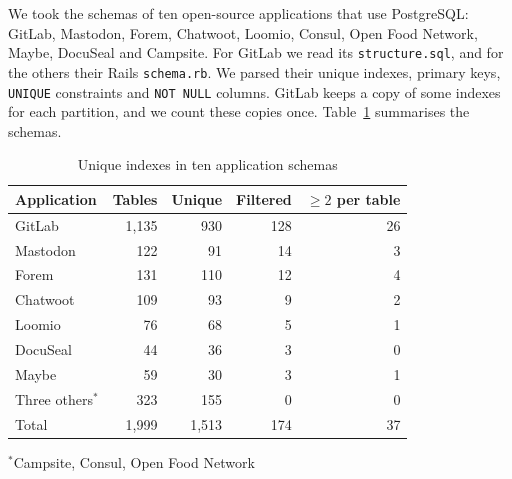 \documentclass[conference]{IEEEtran}
\theoremstyle{definition}
\newcommand{\sql}[1]{\texttt{#1}}
\begin{document}
We took the schemas of ten open-source applications that use PostgreSQL: GitLab, Mastodon, Forem, Chatwoot,
Loomio, Consul, Open Food Network, Maybe, DocuSeal and Campsite. For GitLab we read its \sql{structure.sql}, and for
the others their Rails \sql{schema.rb}. We parsed their unique indexes, primary keys, \sql{UNIQUE} constraints and
\sql{NOT NULL} columns. GitLab keeps a copy of some indexes for each partition, and we count these copies once.
Table~\ref{tab:schemas} summarises the schemas.

\begin{table}[t]
\caption{Unique indexes in ten application schemas}\label{tab:schemas}
\centering\small
\setlength{\tabcolsep}{4pt}
\begin{tabular}{lrrrr}
\toprule
Application & Tables & Unique & Filtered & $\ge2$ per table \\
\midrule
GitLab & 1{,}135 & 930 & 128 & 26 \\
Mastodon & 122 & 91 & 14 & 3 \\
Forem & 131 & 110 & 12 & 4 \\
Chatwoot & 109 & 93 & 9 & 2 \\
Loomio & 76 & 68 & 5 & 1 \\
DocuSeal & 44 & 36 & 3 & 0 \\
Maybe & 59 & 30 & 3 & 1 \\
Three others$^{*}$ & 323 & 155 & 0 & 0 \\
\midrule
Total & 1{,}999 & 1{,}513 & 174 & 37 \\
\bottomrule
\end{tabular}

\smallskip\footnotesize $^{*}$Campsite, Consul, Open Food Network
\end{table}
\end{document}
